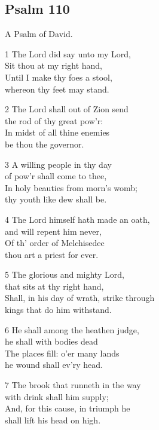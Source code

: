 \begin{center}
\quad{}\quad{}
\end{center}

\subsection*{Psalm 110}

A Psalm of David.

1 The Lord did say unto my Lord,\\
Sit thou at my right hand,\\
Until I make thy foes a stool,\\
whereon thy feet may stand.

2 The Lord shall out of Zion send\\
the rod of thy great pow’r:\\
In midst of all thine enemies\\
be thou the governor.

3 A willing people in thy day\\
of pow’r shall come to thee,\\
In holy beauties from morn’s womb;\\
thy youth like dew shall be.

4 The Lord himself hath made an oath,\\
and will repent him never,\\
Of th’ order of Melchisedec\\
thou art a priest for ever.

5 The glorious and mighty Lord,\\
that sits at thy right hand,\\
Shall, in his day of wrath, strike through\\
kings that do him withstand.

6 He shall among the heathen judge,\\
he shall with bodies dead\\
The places fill: o’er many lands\\
he wound shall ev’ry head.

7 The brook that runneth in the way\\
with drink shall him supply;\\
And, for this cause, in triumph he\\
shall lift his head on high.


\begin{center}
\quad{}\quad{}
\end{center}

